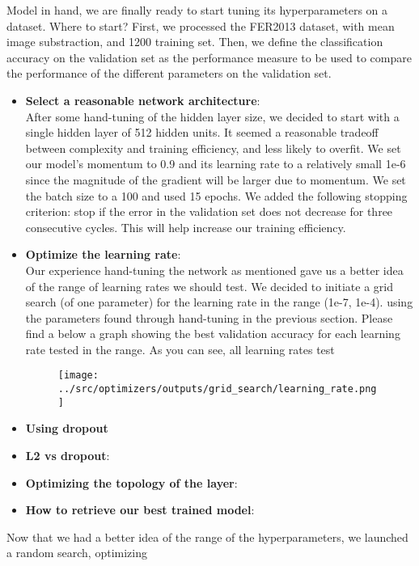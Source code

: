 Model in hand, we are finally ready to start tuning its hyperparameters on a dataset.
Where to start?
First, we processed the FER2013 dataset, with mean image substraction, and 1200 training set.
Then, we define the classification accuracy on the validation set as
the performance measure to be used to compare the performance of the different parameters on the validation set.

\begin{itemize}[topsep=-13pt]
\item \textbf{Select a reasonable network architecture}:\\
  After some hand-tuning of the hidden layer size, we decided to start with a single hidden layer of 512 hidden units.
  It seemed a reasonable tradeoff between complexity and training efficiency, and less likely to overfit.
  We set our model's momentum to 0.9 and its learning rate to a relatively small 1e-6
  since the magnitude of the gradient will be larger due to momentum.
  We set the batch size to a 100 and used 15 epochs.
  We added the following stopping criterion: stop if the error in the validation set does not decrease for three consecutive cycles.
  This will help increase our training efficiency.

\item \textbf{Optimize the learning rate}:\\
  Our experience hand-tuning the network as mentioned gave us a better idea of the range of learning rates we should test.
  We decided to initiate a grid search (of one parameter) for the learning rate in the range (1e-7, 1e-4).
  using the parameters found through hand-tuning in the previous section.
  Please find a below a graph showing the best validation accuracy for each learning rate tested in the range.
  As you can see, all learning rates test 
  \begin{figure}[!ht]
      \centering
      {{\texttt{[image: ../src/optimizers/outputs/grid\_search/learning\_rate.png]}}}
  \end{figure}


\item \textbf{Using dropout}\\


\item \textbf{L2 vs dropout}:\\

\item \textbf{Optimizing the topology of the layer}:\\  
  
\item \textbf{How to retrieve our best trained model}:\\
\end{itemize}
  



Now that we had a better idea of the range of the hyperparameters, we launched a random search, optimizing
